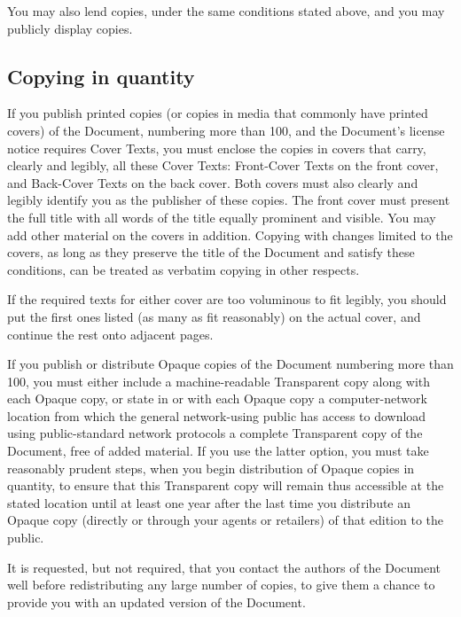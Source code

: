 {\tiny{}You may also lend copies, under the same conditions stated
above, and you may publicly display copies.}{\tiny\par}

\subsection{Copying in quantity\label{subsec:3Copying-in-quantity}}

{\tiny{}If you publish printed copies (or copies in media that commonly
have printed covers) of the Document, numbering more than 100, and
the Document\textsf{'}s license notice requires Cover Texts, you must enclose
the copies in covers that carry, clearly and legibly, all these Cover
Texts: Front-Cover Texts on the front cover, and Back-Cover Texts
on the back cover. Both covers must also clearly and legibly identify
you as the publisher of these copies. The front cover must present
the full title with all words of the title equally prominent and visible.
You may add other material on the covers in addition. Copying with
changes limited to the covers, as long as they preserve the title
of the Document and satisfy these conditions, can be treated as verbatim
copying in other respects.}{\tiny\par}

{\tiny{}If the required texts for either cover are too voluminous
to fit legibly, you should put the first ones listed (as many as fit
reasonably) on the actual cover, and continue the rest onto adjacent
pages.}{\tiny\par}

{\tiny{}If you publish or distribute Opaque copies of the Document
numbering more than 100, you must either include a machine-readable
Transparent copy along with each Opaque copy, or state in or with
each Opaque copy a computer-network location from which the general
network-using public has access to download using public-standard
network protocols a complete Transparent copy of the Document, free
of added material. If you use the latter option, you must take reasonably
prudent steps, when you begin distribution of Opaque copies in quantity,
to ensure that this Transparent copy will remain thus accessible at
the stated location until at least one year after the last time you
distribute an Opaque copy (directly or through your agents or retailers)
of that edition to the public.}{\tiny\par}

{\tiny{}It is requested, but not required, that you contact the authors
of the Document well before redistributing any large number of copies,
to give them a chance to provide you with an updated version of the
Document.}{\tiny\par}

